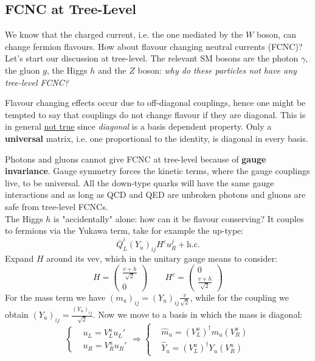 \documentclass[../main.tex]{subfiles}
\begin{document}
\subsection{FCNC at Tree-Level}
We know that the charged current, i.e. the one mediated by the $W$ boson, can change fermion flavours. How about flavour changing neutral currents (FCNC)? Let's start our discussion at tree-level. The relevant SM bosons are the photon $\gamma$, the gluon $g$, the Higgs $h$ and the $Z$ boson: \textit{why do these particles not have any tree-level FCNC?}\\
\begin{kaobox}[frametitle=Remark]
Flavour changing effects occur due to off-diagonal couplings, hence one might be tempted to say that couplings do not change flavour if they are diagonal. This is in general \underline{not true} since \textit{diagonal} is a basis dependent property. Only a \textbf{universal} matrix, i.e. one proportional to the identity, is diagonal in every basis.
\end{kaobox}
Photons and gluons cannot give FCNC at tree-level because of \textbf{gauge invariance}. Gauge symmetry forces the kinetic terms, where the gauge couplings live, to be universal. All the down-type quarks will have the same gauge interactions and as long as QCD and QED are unbroken photons and gluons are safe from tree-level FCNCs.\\
The Higgs $h$ is "accidentally" alone: how can it be flavour conserving? It couples to fermions via the Yukawa term, take for example the up-type: 
\[
\overline{Q}_L^i(Y_u)_{ij}H^cu_R^j+\text{h.c.}
\]
Expand $H$ around its vev, which in the unitary gauge means to consider:
\[
H=\left(\begin{array}{c}
    \frac{v+h}{\sqrt{2}} \\
    0
\end{array}\right)
\qquad
H^c=\left(\begin{array}{c}
    0\\
    \frac{v+h}{\sqrt{2}}
\end{array}\right)
\]
For the mass term we have $(m_u)_{ij}=(Y_u)_{ij}\frac{v}{\sqrt{2}}$, while for the coupling we obtain $(Y_u)_{ij}=\frac{(Y_u)_{ij}}{\sqrt{2}}$. Now we move to a basis in which the mass is diagonal:
\[
\left\{
\begin{aligned}
&u_L=V_L^uu_L'\\
&u_R=V_R^uu_R'
\end{aligned}
\right.
\Rightarrow
\left\{
\begin{aligned}
&\hat{m}_u=(V_L^u)^\dagger m_u(V_R^u)\\
&\hat{Y}_u=(V_L^u)^\dagger Y_u(V_R^u)
\end{aligned}
\right.
\]
\end{document}
